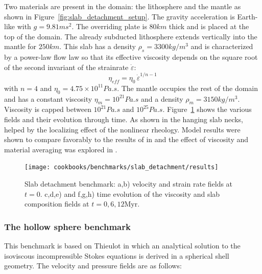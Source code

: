 \documentclass{article}
\begin{document}
Two materials are present in the domain: the lithosphere and the mantle as shown 
in Figure~\ref{fig:slab_detachment_setup}. The gravity acceleration 
is Earth-like with $g=9.81 \si{m}\si{s}^2$.
The overriding plate is $80\si{km}$ thick and is placed at the top of the domain. 
The already subducted lithosphere extends vertically into the mantle for $250 \si{km}$. 
This slab has a density $\rho_s=3300\si{kg}/\si{m}^3$ and is characterized by a power-law flow law so that 
its effective viscosity depends on the square root of the second invariant 
of the strainrate $\dot\varepsilon$:
\[
\eta_{eff} = \eta_0 \, \dot\varepsilon^{1/n-1} 
\]
with $n=4$ and $\eta_0=4.75\times 10^{11}\si{Pa . s}$.
The mantle occupies the rest of the domain and has a constant viscosity $\eta_m=10^{21}\si{Pa . s}$ 
and a density $\rho_m=3150\si{kg}/\si{m}^3$. Viscosity is capped between $10^{21}\si{Pa . s}$ and $10^{25}\si{Pa . s}$.
Figure~\ref{fig:slab_detachment_evolution} shows the various fields and their evolution through time. 
As shown in \cite{schm11,gltf18} the hanging slab necks, helped by the localizing effect of the 
nonlinear rheology. Model results were shown to compare favorably to the results of \cite{schm11} in \cite{gltf18,hitg14} 
and the effect of viscosity and material averaging was explored in \cite{gltf18}.

\begin{figure}
\centering
\texttt{[image: cookbooks/benchmarks/slab\_detachment/results]}
\caption{Slab detachment benchmark: a,b) velocity and strain rate fields at $t=0$. 
c,d,e) and f,g,h) time evolution of the viscosity and slab composition fields at $t=0, 6, 12\text{Myr}$.
\label{fig:slab_detachment_evolution}}
\end{figure}

\subsubsection{The hollow sphere benchmark}

\label{sec:cookbooks-hollow-sphere}

This benchmark is based on Thieulot \cite{THIE17} in which an analytical solution to the
isoviscous incompressible Stokes equations is derived in a spherical shell geometry.
The velocity and pressure fields are as follows:
\end{document}
